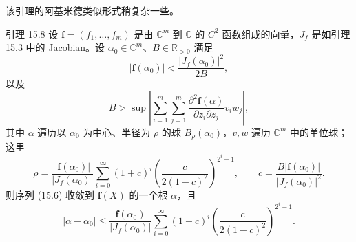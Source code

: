 该引理的阿基米德类似形式稍复杂一些。
\begin{statement}{引理 15.8}
设 $\mathbf f=(f_1,\ldots,f_m)$ 是由 $\mathbb C^m$ 到 $\mathbb C$ 的 $C^2$ 函数组成的向量，$J_f$ 是如引理 15.3 中的 Jacobian。设 $\alpha_0\in\mathbb C^m$、$B\in\mathbb R_{>0}$ 满足
\begin{equation*}\tag{15.9}
|\mathbf f(\alpha_0)|<\frac{|J_f(\alpha_0)|^2}{2B},
\end{equation*}
以及
\begin{equation*}\tag{15.10}
B>\sup\left|\sum_{i=1}^m\sum_{j=1}^m
\frac{\partial^2\mathbf f(\alpha)}{\partial z_i\partial z_j}v_iw_j\right|,
\end{equation*}
其中 $\alpha$ 遍历以 $\alpha_0$ 为中心、半径为 $\rho$ 的球 $B_\rho(\alpha_0)$，$v,w$ 遍历 $\mathbb C^m$ 中的单位球；这里
\[
\rho=\frac{|\mathbf f(\alpha_0)|}{|J_f(\alpha_0)|}
\sum_{i=0}^{\infty}(1+c)^i\left(\frac{c}{2(1-c)^2}\right)^{2^i-1},
\qquad c=\frac{B|\mathbf f(\alpha_0)|}{|J_f(\alpha_0)|^2}.
\]
则序列 (15.6) 收敛到 $\mathbf f(X)$ 的一个根 $\alpha$，且
\begin{equation*}\tag{15.11}
|\alpha-\alpha_0|\le\frac{|\mathbf f(\alpha_0)|}{|J_f(\alpha_0)|}
\sum_{i=0}^{\infty}(1+c)^i\left(\frac{c}{2(1-c)^2}\right)^{2^i-1}.
\end{equation*}
\end{statement}
